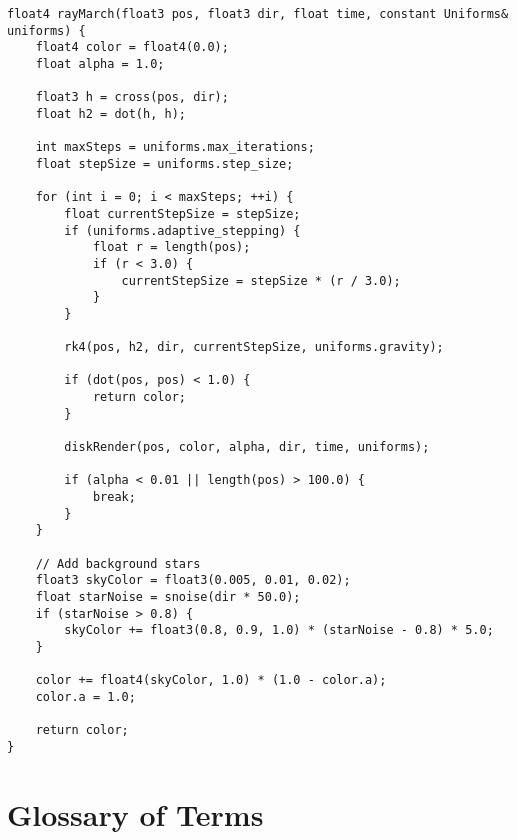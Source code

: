 \documentclass[12pt,a4paper]{article}
\theoremstyle{definition}
\theoremstyle{remark}
\begin{document}
\begin{lstlisting}[style=metalstyle, caption=Complete ray marching implementation]
float4 rayMarch(float3 pos, float3 dir, float time, constant Uniforms& uniforms) {
    float4 color = float4(0.0);
    float alpha = 1.0;
    
    float3 h = cross(pos, dir);
    float h2 = dot(h, h);
    
    int maxSteps = uniforms.max_iterations;
    float stepSize = uniforms.step_size;
    
    for (int i = 0; i < maxSteps; ++i) {
        float currentStepSize = stepSize;
        if (uniforms.adaptive_stepping) {
            float r = length(pos);
            if (r < 3.0) {
                currentStepSize = stepSize * (r / 3.0);
            }
        }
        
        rk4(pos, h2, dir, currentStepSize, uniforms.gravity);
        
        if (dot(pos, pos) < 1.0) {
            return color;
        }
        
        diskRender(pos, color, alpha, dir, time, uniforms);
        
        if (alpha < 0.01 || length(pos) > 100.0) {
            break;
        }
    }
    
    // Add background stars
    float3 skyColor = float3(0.005, 0.01, 0.02);
    float starNoise = snoise(dir * 50.0);
    if (starNoise > 0.8) {
        skyColor += float3(0.8, 0.9, 1.0) * (starNoise - 0.8) * 5.0;
    }
    
    color += float4(skyColor, 1.0) * (1.0 - color.a);
    color.a = 1.0;
    
    return color;
}
\end{lstlisting}

\section{Glossary of Terms}
\end{document}
